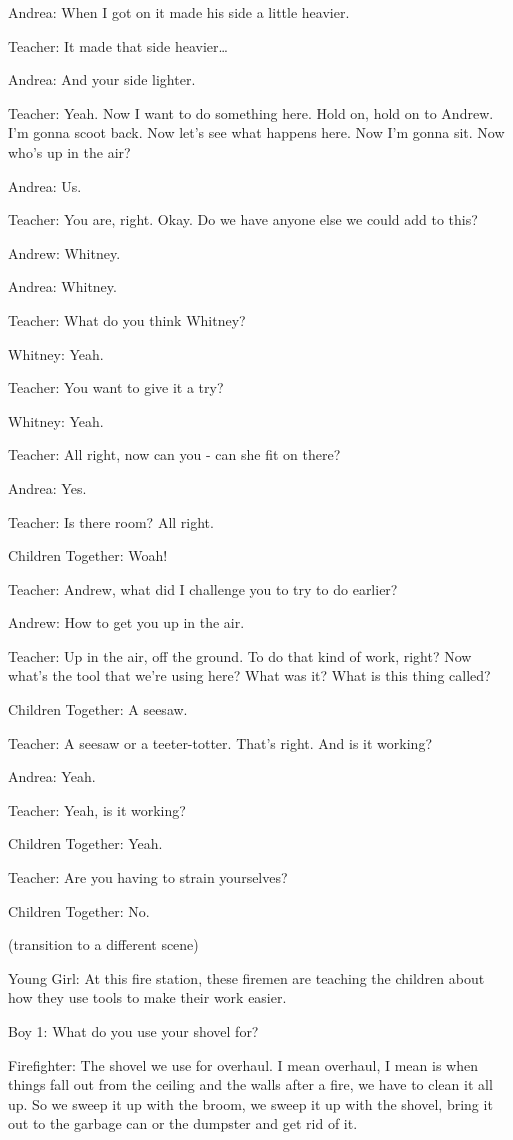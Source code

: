 Andrea: When I got on it made his side a little heavier.

Teacher: It made that side heavier\dots

Andrea: And your side lighter.

Teacher: Yeah. Now I want to do something here. Hold on, hold on to Andrew. I'm gonna scoot back. Now let's see what happens here. Now I'm gonna sit. Now who's up in the air?

Andrea: Us.

Teacher: You are, right. Okay. Do we have anyone else we could add to this?

Andrew: Whitney.

Andrea: Whitney.

Teacher: What do you think Whitney?

Whitney: Yeah.

Teacher: You want to give it a try?

Whitney: Yeah.

Teacher: All right, now can you - can she fit on there?

Andrea: Yes.

Teacher: Is there room? All right.

Children Together: Woah!

Teacher: Andrew, what did I challenge you to try to do earlier?

Andrew: How to get you up in the air.

Teacher: Up in the air, off the ground. To do that kind of work, right? Now what's the tool that we're using here? What was it? What is this thing called?

Children Together: A seesaw.

Teacher: A seesaw or a teeter-totter. That's right. And is it working?

Andrea: Yeah.

Teacher: Yeah, is it working?

Children Together: Yeah.

Teacher: Are you having to strain yourselves?

Children Together: No.

(transition to a different scene)

Young Girl: At this fire station, these firemen are teaching the children about how they use tools to make their work easier.

Boy 1: What do you use your shovel for?

Firefighter: The shovel we use for overhaul. I mean overhaul, I mean is when things fall out from the ceiling and the walls after a fire, we have to clean it all up. So we sweep it up with the broom, we sweep it up with the shovel, bring it out to the garbage can or the dumpster and get rid of it.

